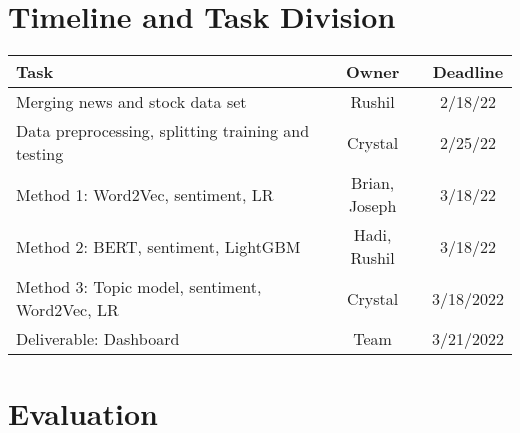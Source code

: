 \documentclass[conference]{IEEEtran}
\begin{document}
\section*{Timeline and Task Division}
\begin{table}[htbp]
    \begin{center}
        \begin{tabular}{|l||c|c|} \hline\hline
            Task                                               & Owner         & Deadline  \\ \hline
            Merging news and stock data set                    & Rushil        & 2/18/22   \\
            Data preprocessing, splitting training and testing & Crystal       & 2/25/22   \\
            Method 1: Word2Vec, sentiment, LR                  & Brian, Joseph & 3/18/22   \\
            Method 2: BERT, sentiment, LightGBM                & Hadi, Rushil  & 3/18/22   \\
            Method 3: Topic model, sentiment, Word2Vec, LR     & Crystal       & 3/18/2022 \\
            Deliverable: Dashboard                             & Team          & 3/21/2022 \\
            \hline\hline
        \end{tabular}
    \end{center}
\end{table}

\section*{Evaluation}
\end{document}
